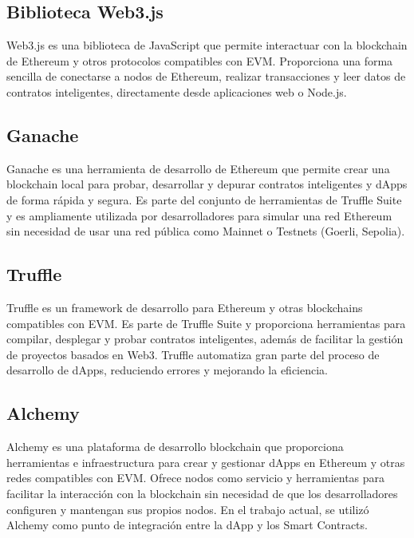 






\subsection{Biblioteca Web3.js}

Web3.js \citep{web3} es una biblioteca de JavaScript que permite interactuar con la blockchain de Ethereum y otros protocolos compatibles con EVM. Proporciona una forma sencilla de conectarse a nodos de Ethereum, realizar transacciones y leer datos de contratos inteligentes, directamente desde aplicaciones web o Node.js.


\subsection{Ganache}

Ganache \cite{ganache_website} es una herramienta de desarrollo de Ethereum que permite crear una blockchain local para probar, desarrollar y depurar contratos inteligentes y dApps de forma rápida y segura. Es parte del conjunto de herramientas de Truffle Suite y es ampliamente utilizada por desarrolladores para simular una red Ethereum sin necesidad de usar una red pública como Mainnet o Testnets (Goerli, Sepolia).


\subsection{Truffle}

Truffle \cite{truffle_website} es un framework de desarrollo para Ethereum y otras blockchains compatibles con EVM. Es parte de Truffle Suite y proporciona herramientas para compilar, desplegar y probar contratos inteligentes, además de facilitar la gestión de proyectos basados en Web3. Truffle automatiza gran parte del proceso de desarrollo de dApps, reduciendo errores y mejorando la eficiencia.

\subsection{Alchemy}

Alchemy \cite{alchemy_website} es una plataforma de desarrollo blockchain que proporciona herramientas e infraestructura para crear y gestionar dApps en Ethereum y otras redes compatibles con EVM. Ofrece nodos como servicio y herramientas para facilitar la interacción con la blockchain sin necesidad de que los desarrolladores configuren y mantengan sus propios nodos. En el trabajo actual, se utilizó Alchemy como punto de integración entre la dApp y los Smart Contracts.

